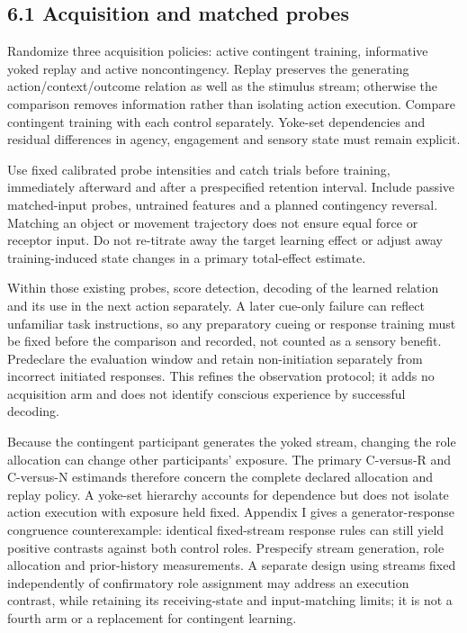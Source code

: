 \documentclass[
  american,
  11pt,
  letterpaper,
]{article}
\begin{document}
\subsection{6.1 Acquisition and matched probes}\label{acquisition-and-matched-probes}

Randomize three acquisition policies: active contingent training, informative yoked replay and active noncontingency. Replay preserves the generating action/context/outcome relation as well as the stimulus stream; otherwise the comparison removes information rather than isolating action execution. Compare contingent training with each control separately. Yoke-set dependencies and residual differences in agency, engagement and sensory state must remain explicit.

Use fixed calibrated probe intensities and catch trials before training, immediately afterward and after a prespecified retention interval. Include passive matched-input probes, untrained features and a planned contingency reversal. Matching an object or movement trajectory does not ensure equal force or receptor input. Do not re-titrate away the target learning effect or adjust away training-induced state changes in a primary total-effect estimate.

Within those existing probes, score detection, decoding of the learned relation and its use in the next action separately. A later cue-only failure can reflect unfamiliar task instructions, so any preparatory cueing or response training must be fixed before the comparison and recorded, not counted as a sensory benefit. Predeclare the evaluation window and retain non-initiation separately from incorrect initiated responses. This refines the observation protocol; it adds no acquisition arm and does not identify conscious experience by successful decoding.

Because the contingent participant generates the yoked stream, changing the role allocation can change other participants' exposure. The primary C-versus-R and C-versus-N estimands therefore concern the complete declared allocation and replay policy. A yoke-set hierarchy accounts for dependence but does not isolate action execution with exposure held fixed. Appendix I gives a generator-response congruence counterexample: identical fixed-stream response rules can still yield positive contrasts against both control roles. Prespecify stream generation, role allocation and prior-history measurements. A separate design using streams fixed independently of confirmatory role assignment may address an execution contrast, while retaining its receiving-state and input-matching limits; it is not a fourth arm or a replacement for contingent learning.
\end{document}
